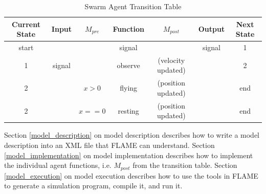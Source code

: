 \begin{table}[ht]
\centering
\begin{tabular}{|c|c|c||c||c|c|c|}
\hline
Current State&Input&$M_{pre}$&Function&$M_{post}$&Output&Next State\\
\hline
\hline
start&&&signal&&signal&1\\
\hline
1&signal&&observe&(velocity updated)&&2\\
\hline
2&&$x > 0$&flying&(position updated)&&end\\
\hline
2&&$x == 0$&resting&(position updated)&&end\\
\hline
\end{tabular}
\caption{Swarm Agent Transition Table}
\label{tab:swarmtransition}
\end{table}

Section \ref{model_description} on model description describes how to write a
model description into an XML file that FLAME can understand. Section
\ref{model_implementation} on model implementation describes how to implement
the individual agent functions, i.e. $M_{post}$ from the transition table.
Section \ref{model_execution} on model execution describes how to use the tools
in FLAME to generate a simulation program, compile it, and run it.


